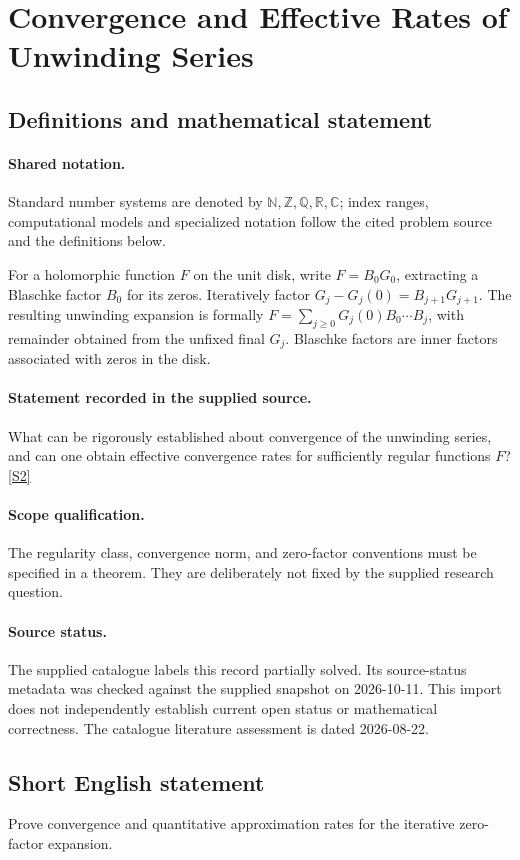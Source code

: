 \documentclass[11pt]{article}
\newcommand{\sref}[2]{\hyperlink{source:#1:#2}{[S#2]}}
\begin{document}
\section{Convergence and Effective Rates of Unwinding Series}\label{statement}

\subsection{Definitions and mathematical statement}

\paragraph{Shared notation.}Standard number systems are denoted by $\mathbb N,\mathbb Z,\mathbb Q,\mathbb R,\mathbb C$; index ranges, computational models and specialized notation follow the cited problem source and the definitions below.


For a holomorphic function $F$ on the unit disk, write $F=B_0G_0$, extracting a Blaschke factor $B_0$ for its zeros. Iteratively factor $G_j-G_j(0)=B_{j+1}G_{j+1}$. The resulting unwinding expansion is formally $F=\sum_{j\geq0}G_j(0)B_0\cdots B_j$, with remainder obtained from the unfixed final $G_j$. Blaschke factors are inner factors associated with zeros in the disk.
\paragraph{Statement recorded in the supplied source.}
What can be rigorously established about convergence of the unwinding series, and can one obtain effective convergence rates for sufficiently regular functions $F$? \sref{statement}{2}
\paragraph{Scope qualification.}
The regularity class, convergence norm, and zero-factor conventions must be specified in a theorem. They are deliberately not fixed by the supplied research question.
\paragraph{Source status.}
The supplied catalogue labels this record partially solved. Its source-status metadata was checked against the supplied snapshot on 2026-10-11. This import does not independently establish current open status or mathematical correctness. The catalogue literature assessment is dated 2026-08-22.
\subsection{Short English statement}
Prove convergence and quantitative approximation rates for the iterative zero-factor expansion.
\end{document}
